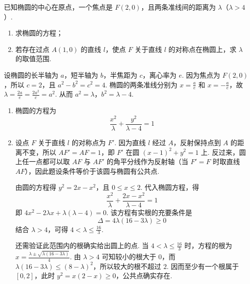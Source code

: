 \begin{problem}
已知椭圆的中心在原点，一个焦点是 \(F(2,0)\)，且两条准线间的距离为 \(\lambda\)（\(\lambda > 4\)）.
\begin{enumerate}
\item 求椭圆的方程；
\item 若存在过点 \(A(1,0)\) 的直线 \(l\)，使点 \(F\) 关于直线 \(l\) 的对称点在椭圆上，求 \( \lambda \) 的取值范围.
\end{enumerate}

\begin{solution}
设椭圆的长半轴为 \(a\)，短半轴为 \(b\)，半焦距为 \(c\)，离心率为 \(e\). 因为焦点为 \(F(2,0)\)，所以 \(c=2\)，且 \(a^2-b^2=c^2=4\). 椭圆的两条准线分别为 \(x=\frac{a}{e}\) 和 \(x=-\frac{a}{e}\)，故
\(\lambda=\frac{2a}{e}=\frac{2a^2}{c}=a^2\). 从而 \(a^2=\lambda\)，\(b^2=\lambda-4\).

\begin{enumerate}
\item 椭圆的方程为
\[
\frac{x^2}{\lambda}+\frac{y^2}{\lambda-4}=1
\]

\item 设点 \(F\) 关于直线 \(l\) 的对称点为 \(F'\). 因为直线 \(l\) 经过 \(A\)，反射保持点到 \(A\) 的距离不变，所以 \(AF'=AF=1\)，即 \(F'\) 在圆
\(\left(x-1\right)^2+y^2=1\) 上. 反过来，圆上任一点都可以取 \(AF\) 与 \(AF'\) 的角平分线作为反射轴（当 \(F'=F\) 时取直线 \(AF\)），因此题设条件等价于该圆与椭圆有公共点.

由圆的方程得 \(y^2=2x-x^2\)，且 \(0\leqslant x\leqslant2\). 代入椭圆方程，得
\[
\frac{x^2}{\lambda}+\frac{2x-x^2}{\lambda-4}=1
\]
即 \(4x^2-2\lambda x+\lambda\left(\lambda-4\right)=0\). 该方程有实根的充要条件是
\[
\Delta=4\lambda\left(16-3\lambda\right)\geqslant0
\]
结合 \(\lambda>4\)，可得 \(4<\lambda\leqslant\frac{16}{3}\).

还需验证此范围内的根确实给出圆上的点. 当 \(4<\lambda\leqslant\frac{16}{3}\) 时，方程的根为
\(x=\frac{\lambda\pm\sqrt{\lambda\left(16-3\lambda\right)}}{4}\). 由 \(\lambda>4\) 可知较小的根大于 \(0\)，而
\(\lambda\left(16-3\lambda\right)\leqslant\left(8-\lambda\right)^2\)，所以较大的根不超过 \(2\). 因而至少有一个根属于 \([0,2]\)，此时 \(y^2=x\left(2-x\right)\geqslant0\)，公共点确实存在.
\end{enumerate}
\end{solution}
\end{problem}

